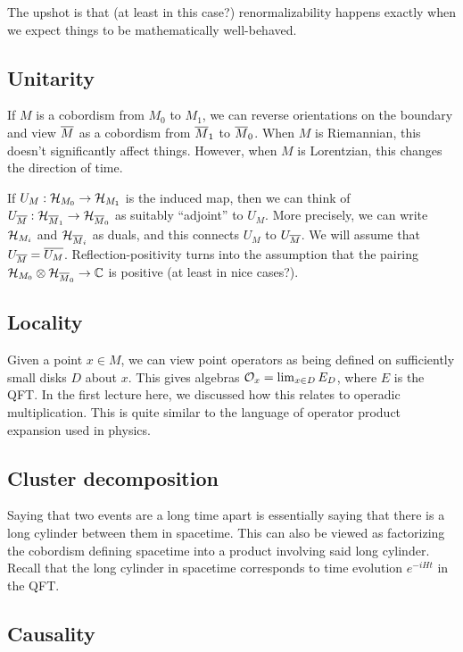 The upshot is that (at least in this case?) renormalizability happens exactly when we expect things to be mathematically well-behaved.

\subsection{Unitarity}

If $M$ is a cobordism from $M_0$ to $M_1$, we can reverse orientations on the boundary and view $\overline{M}$ as a cobordism from $\overline{M}_1$ to $\overline{M}_0$.
When $M$ is Riemannian, this doesn't significantly affect things.
However, when $M$ is Lorentzian, this changes the direction of time.

If $U_M: \mathcal{H}_{M_0} \to \mathcal{H}_{M_1}$ is the induced map, then we can think of $U_{\overline{M}}: \mathcal{H}_{\overline{M}_1} \to \mathcal{H}_{\overline{M}_0}$ as suitably ``adjoint'' to $U_M$.
More precisely, we can write $\mathcal{H}_{M_i}$ and $\mathcal{H}_{\overline{M}_i}$ as duals, and this connects $U_M$ to $U_{\overline{M}}$.
We will assume that $U_{\overline{M}} = \overline{U_M}$.
Reflection-positivity turns into the assumption that the pairing $\mathcal{H}_{M_0} \otimes \mathcal{H}_{\overline{M}_0} \to \mathbb{C}$ is positive (at least in nice cases?).

\subsection{Locality}

Given a point $x \in M$, we can view point operators as being defined on sufficiently small disks $D$ about $x$.
This gives algebras $\mathcal{O}_x = \lim_{x \in D} E_D$, where $E$ is the QFT.
In the first lecture here, we discussed how this relates to operadic multiplication.
This is quite similar to the language of operator product expansion used in physics.

\subsection{Cluster decomposition}

Saying that two events are a long time apart is essentially saying that there is a long cylinder between them in spacetime.
This can also be viewed as factorizing the cobordism defining spacetime into a product involving said long cylinder.
Recall that the long cylinder in spacetime corresponds to time evolution $e^{-i H t}$ in the QFT.

\subsection{Causality}

